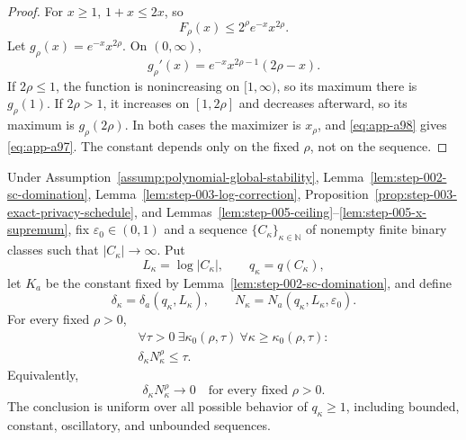 \begin{proof}
For \(x\geq1\), \(1+x\leq2x\), so
\begin{equation}
F_\rho(x)\leq2^\rho e^{-x}x^{2\rho}.
\label{eq:app-a98}
\end{equation}
Let \(g_\rho(x)=e^{-x}x^{2\rho}\).  On \((0,\infty)\),
\begin{equation}
g_\rho'(x)
=e^{-x}x^{2\rho-1}(2\rho-x).
\label{eq:app-a99}
\end{equation}
If \(2\rho\leq1\), the function is nonincreasing on
\([1,\infty)\), so its maximum there is \(g_\rho(1)\).  If
\(2\rho>1\), it increases on \([1,2\rho]\) and decreases afterward,
so its maximum is \(g_\rho(2\rho)\).  In both cases the maximizer is
\(x_\rho\), and \eqref{eq:app-a98} gives \eqref{eq:app-a97}.  The constant depends only on
the fixed \(\rho\), not on the sequence.
\end{proof}

\begin{proposition}
\label{prop:step-005-privacy-negligibility}
Under Assumption~\ref{assump:polynomial-global-stability},
Lemma~\ref{lem:step-002-sc-domination},
Lemma~\ref{lem:step-003-log-correction},
Proposition~\ref{prop:step-003-exact-privacy-schedule}, and
Lemmas~\ref{lem:step-005-ceiling}--\ref{lem:step-005-x-supremum},
fix \(\varepsilon_0\in(0,1)\) and a sequence
\(\{C_\kappa\}_{\kappa\in\mathbb N}\) of nonempty finite binary
classes such that \(|C_\kappa|\to\infty\).  Put
\[
L_\kappa=\log|C_\kappa|,\qquad q_\kappa=q(C_\kappa),
\]
let \(K_a\) be the constant fixed by
Lemma~\ref{lem:step-002-sc-domination}, and define
\[
\delta_\kappa=\delta_a(q_\kappa,L_\kappa),\qquad
N_\kappa=N_a(q_\kappa,L_\kappa,\varepsilon_0).
\]
For every fixed \(\rho>0\),
\begin{equation}
\begin{gathered}
\forall\tau>0\ \exists\kappa_0(\rho,\tau)\
\forall\kappa\geq\kappa_0(\rho,\tau):\\
\delta_\kappa N_\kappa^\rho\leq\tau.
\end{gathered}
\label{eq:app-a100}
\end{equation}
Equivalently,
\begin{equation}
\delta_\kappa N_\kappa^\rho\longrightarrow0
\quad\text{for every fixed }\rho>0.
\label{eq:app-a101}
\end{equation}
The conclusion is uniform over all possible behavior of
\(q_\kappa\geq1\), including bounded, constant, oscillatory, and
unbounded sequences.
\end{proposition}

